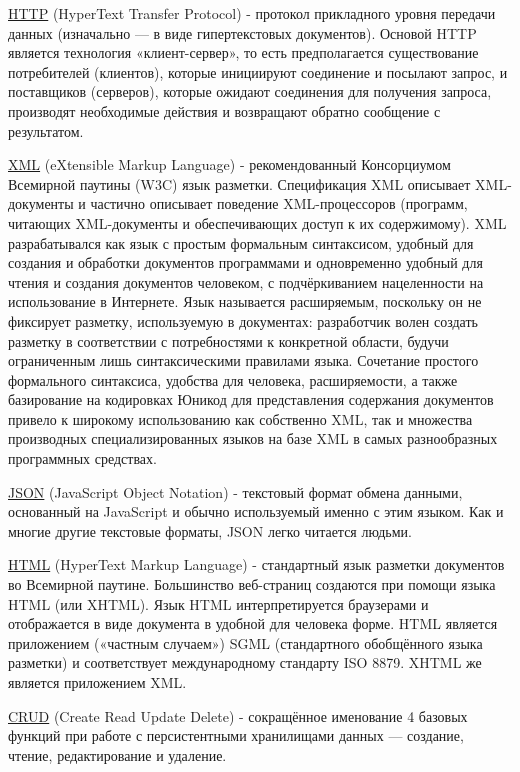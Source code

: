 \underline{HTTP} (HyperText Transfer Protocol) -  протокол прикладного уровня
передачи данных (изначально — в виде гипертекстовых документов). Основой HTTP является
технология «клиент-сервер», то есть предполагается существование потребителей
(клиентов), которые инициируют соединение и посылают запрос, и поставщиков
(серверов), которые ожидают соединения для получения запроса, производят
необходимые действия и возвращают обратно сообщение с результатом.

\underline{XML} (eXtensible Markup Language) - рекомендованный Консорциумом
Всемирной паутины (W3C) язык разметки. Спецификация XML описывает XML-документы и частично
описывает поведение XML-процессоров (программ, читающих XML-документы и
обеспечивающих доступ к их содержимому). XML разрабатывался как язык с простым
формальным синтаксисом, удобный для создания и обработки документов программами
и одновременно удобный для чтения и создания документов человеком, с
подчёркиванием нацеленности на использование в Интернете. Язык называется
расширяемым, поскольку он не фиксирует разметку, используемую в документах:
разработчик волен создать разметку в соответствии с потребностями к конкретной
области, будучи ограниченным лишь синтаксическими правилами языка. Сочетание
простого формального синтаксиса, удобства для человека, расширяемости, а также
базирование на кодировках Юникод для представления содержания документов привело
к широкому использованию как собственно XML, так и множества производных
специализированных языков на базе XML в самых разнообразных программных
средствах.

\underline{JSON} (JavaScript Object Notation) - текстовый формат обмена данными,
основанный на JavaScript и обычно используемый именно с этим языком. Как и
многие другие текстовые форматы, JSON легко читается людьми.

\underline{HTML} (HyperText Markup Language) - стандартный язык разметки
документов во Всемирной паутине. Большинство веб-страниц создаются при помощи
языка HTML (или XHTML). Язык HTML интерпретируется браузерами и отображается в
виде документа в удобной для человека форме. HTML является приложением («частным
случаем») SGML (стандартного обобщённого языка разметки) и соответствует
международному стандарту ISO 8879. XHTML же является приложением XML.

\underline{CRUD} (Create Read Update Delete) - сокращённое именование 4 базовых
функций при работе с персистентными хранилищами данных — создание, чтение,
редактирование и удаление.

